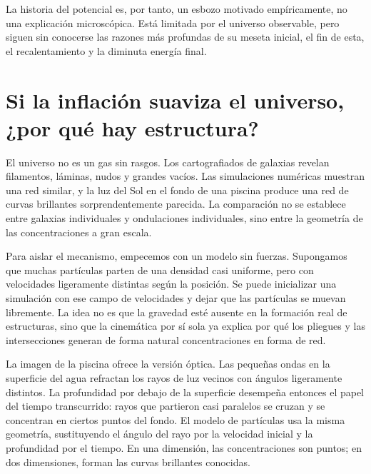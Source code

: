 La historia del potencial es, por tanto, un esbozo motivado empíricamente, no una explicación microscópica. Está limitada por el universo observable, pero siguen sin conocerse las razones más profundas de su meseta inicial, el fin de esta, el recalentamiento y la diminuta energía final.

\section{Si la inflación suaviza el universo, ¿por qué hay estructura?}

El universo no es un gas sin rasgos. Los cartografiados de galaxias revelan filamentos, láminas, nudos y grandes vacíos. Las simulaciones numéricas muestran una red similar, y la luz del Sol en el fondo de una piscina produce una red de curvas brillantes sorprendentemente parecida. La comparación no se establece entre galaxias individuales y ondulaciones individuales, sino entre la geometría de las concentraciones a gran escala.

Para aislar el mecanismo, empecemos con un modelo sin fuerzas. Supongamos que muchas partículas parten de una densidad casi uniforme, pero con velocidades ligeramente distintas según la posición. Se puede inicializar una simulación con ese campo de velocidades y dejar que las partículas se muevan libremente. La idea no es que la gravedad esté ausente en la formación real de estructuras, sino que la cinemática por sí sola ya explica por qué los pliegues y las intersecciones generan de forma natural concentraciones en forma de red.

\begin{classroomqa}
\end{classroomqa}

La imagen de la piscina ofrece la versión óptica. Las pequeñas ondas en la superficie del agua refractan los rayos de luz vecinos con ángulos ligeramente distintos. La profundidad por debajo de la superficie desempeña entonces el papel del tiempo transcurrido: rayos que partieron casi paralelos se cruzan y se concentran en ciertos puntos del fondo. El modelo de partículas usa la misma geometría, sustituyendo el ángulo del rayo por la velocidad inicial y la profundidad por el tiempo. En una dimensión, las concentraciones son puntos; en dos dimensiones, forman las curvas brillantes conocidas.

